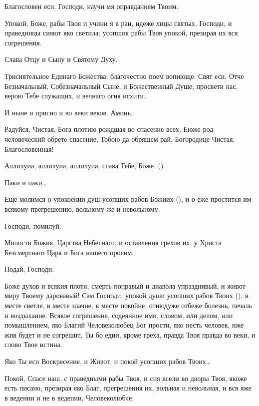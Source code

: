 \begin{mymulticols}
 Благословен еси, Господи, научи мя оправданием Твоим. 

Упокой, Боже, рабы Твоя и учини я в раи, идеже лицы святых, Господи, и праведницы сияют яко светила; усопшия рабы Твоя упокой, презирая их вся согрешения. 

Слава Отцу и Сыну и Святому Духу. 

Трисиятельное Единаго Божества, благочестно поем вопиюще: Свят еси, Отче Безначальный, Собезначальный Сыне, и Божественный Душе; просвети нас, верою Тебе служащих, и вечнаго огня исхити. 

И ныне и присно и во веки веков. Аминь. 

Радуйся, Чистая, Бога плотию рождшая во спасение всех, Еюже род человеческий обрете спасение, Тобою да обрящем рай, Богородице Чистая, Благословенная! 

Аллилуиа, аллилуиа, аллилуиа, слава Тебе, Боже. () 

 Паки и паки… 

Еще молимся о упокоении душ усопших рабов Божиих (), и о еже простится им всякому прегрешению, вольному же и невольному. 

 Господи, помилуй. 

Милости Божия, Царства Небеснаго, и оставления грехов их, у Христа Безсмертнаго Царя и Бога нашего просим. 

 Подай, Господи.




Боже духов и всякия плоти, смерть поправый и диавола упразднивый, и живот миру Твоему даровавый! Сам Господи, упокой души усопших рабов Твоих (), в месте светле, в месте злачне, в месте покойне, отнюдуже отбеже болезнь, печаль и воздыхание. Всякое согрешение, содеянное ими, словом, или делом, или помышлением, яко Благий Человеколюбец Бог прости, яко несть человек, иже жив будет и не согрешит, Ты бо един, кроме греха, правда Твоя правда во веки, и слово Твое истина. 

 Яко Ты еси Воскресение, и Живот, и покой усопших рабов Твоих…




Покой, Спасе наш, с праведными рабы Твоя, и сия всели во дворы Твоя, якоже есть писано, презирая яко Благ, прегрешения их, вольная и невольная, и вся яже в ведении и не в ведении, Человеколюбче. 


\end{mymulticols}

